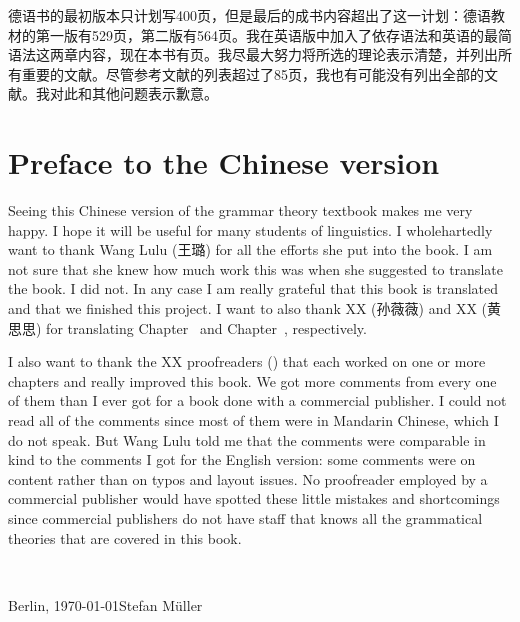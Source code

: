 德语书的最初版本只计划写400页，但是最后的成书内容超出了这一计划：德语教材的第一版有529页，第二版有564页。我在英语版中加入了依存语法和英语的最简语法这两章内容，现在本书有\pageref{LastPage}页。我尽最大努力将所选的理论表示清楚，并列出所有重要的文献。尽管参考文献的列表超过了85页，我也有可能没有列出全部的文献。我对此和其他问题表示歉意。







\section*{Preface to the Chinese version}

Seeing this Chinese version of the grammar theory textbook makes me very happy. I hope it will be useful
for many students of linguistics. I wholehartedly want to thank Wang Lulu (王璐) for all the efforts she
put into the book. I am not sure that she knew how much work this was when she suggested to
translate the book. I did not. In any case I am really grateful that this book is translated and
that we finished this project. I want to also thank XX (孙薇薇) and XX (黄思思) for translating Chapter~ and Chapter~,
respectively.

I also want to thank the XX proofreaders (\makeatletter\@proofreader\makeatother) that each worked on one or more chapters and
really improved this book. We got more comments from every one of them than I ever got for a book
done with a commercial publisher. I could not read all of the comments since most of them were in
Mandarin Chinese, which I do not speak. But Wang Lulu told me that the comments were comparable in
kind to the comments I got for the English version: some comments were on content rather than on typos and layout
issues. No proofreader employed by a commercial publisher would have spotted these little mistakes and
shortcomings since commercial publishers do not have staff that knows all the grammatical
theories that are covered in this book. 

~\medskip

\noindent
Berlin, \today\hfill Stefan Müller


